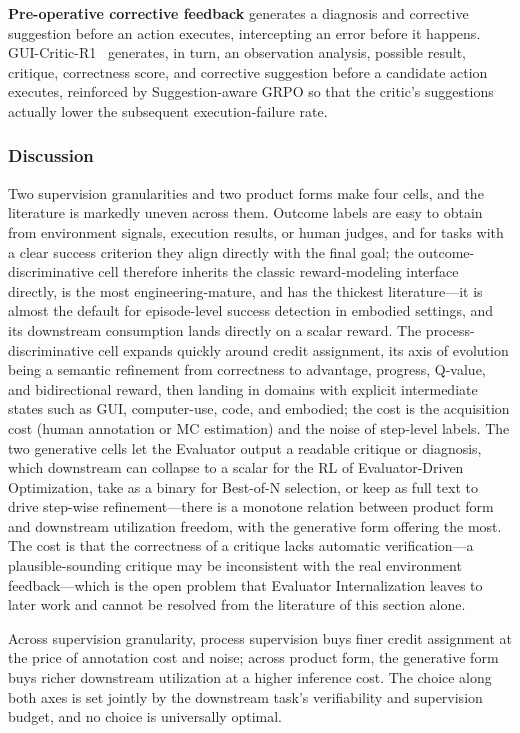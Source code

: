 \textbf{Pre-operative corrective feedback} generates a diagnosis and corrective suggestion before an action executes, intercepting an error before it happens. GUI-Critic-R1~\cite{Wan25q} generates, in turn, an observation analysis, possible result, critique, correctness score, and corrective suggestion before a candidate action executes, reinforced by Suggestion-aware GRPO so that the critic's suggestions actually lower the subsequent execution-failure rate.

\subsubsection{Discussion}

Two supervision granularities and two product forms make four cells, and the literature is markedly uneven across them. Outcome labels are easy to obtain from environment signals, execution results, or human judges, and for tasks with a clear success criterion they align directly with the final goal; the outcome-discriminative cell therefore inherits the classic reward-modeling interface directly, is the most engineering-mature, and has the thickest literature---it is almost the default for episode-level success detection in embodied settings, and its downstream consumption lands directly on a scalar reward. The process-discriminative cell expands quickly around credit assignment, its axis of evolution being a semantic refinement from correctness to advantage, progress, Q-value, and bidirectional reward, then landing in domains with explicit intermediate states such as GUI, computer-use, code, and embodied; the cost is the acquisition cost (human annotation or MC estimation) and the noise of step-level labels. The two generative cells let the Evaluator output a readable critique or diagnosis, which downstream can collapse to a scalar for the RL of Evaluator-Driven Optimization, take as a binary for Best-of-N selection, or keep as full text to drive step-wise refinement---there is a monotone relation between product form and downstream utilization freedom, with the generative form offering the most. The cost is that the correctness of a critique lacks automatic verification---a plausible-sounding critique may be inconsistent with the real environment feedback---which is the open problem that Evaluator Internalization leaves to later work and cannot be resolved from the literature of this section alone.

Across supervision granularity, process supervision buys finer credit assignment at the price of annotation cost and noise; across product form, the generative form buys richer downstream utilization at a higher inference cost. The choice along both axes is set jointly by the downstream task's verifiability and supervision budget, and no choice is universally optimal.

